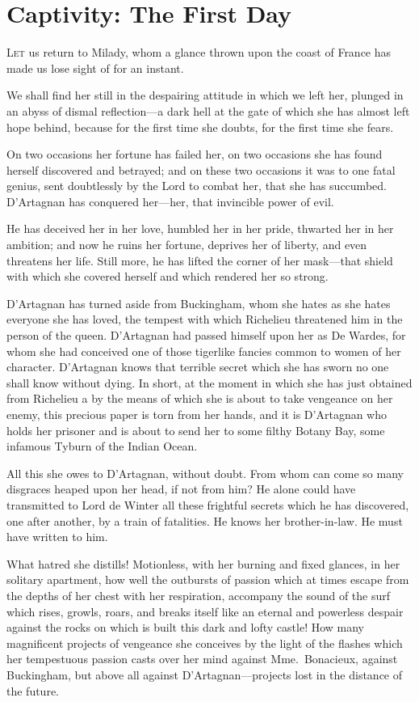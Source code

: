 
\chapter{Captivity: The First Day}

\lettrine{L}{et} us return to Milady, whom a glance thrown upon the coast of France has made us lose sight of for an instant. 

\zz
We shall find her still in the despairing attitude in which we left her, plunged in an abyss of dismal reflection—a dark hell at the gate of which she has almost left hope behind, because for the first time she doubts, for the first time she fears. 

On two occasions her fortune has failed her, on two occasions she has found herself discovered and betrayed; and on these two occasions it was to one fatal genius, sent doubtlessly by the Lord to combat her, that she has succumbed. D'Artagnan has conquered her—her, that invincible power of evil. 

He has deceived her in her love, humbled her in her pride, thwarted her in her ambition; and now he ruins her fortune, deprives her of liberty, and even threatens her life. Still more, he has lifted the corner of her mask—that shield with which she covered herself and which rendered her so strong. 

D'Artagnan has turned aside from Buckingham, whom she hates as she hates everyone she has loved, the tempest with which Richelieu threatened him in the person of the queen. D'Artagnan had passed himself upon her as De Wardes, for whom she had conceived one of those tigerlike fancies common to women of her character. D'Artagnan knows that terrible secret which she has sworn no one shall know without dying. In short, at the moment in which she has just obtained from Richelieu a  by the means of which she is about to take vengeance on her enemy, this precious paper is torn from her hands, and it is D'Artagnan who holds her prisoner and is about to send her to some filthy Botany Bay, some infamous Tyburn of the Indian Ocean. 

All this she owes to D'Artagnan, without doubt. From whom can come so many disgraces heaped upon her head, if not from him? He alone could have transmitted to Lord de Winter all these frightful secrets which he has discovered, one after another, by a train of fatalities. He knows her brother-in-law. He must have written to him. 

What hatred she distills! Motionless, with her burning and fixed glances, in her solitary apartment, how well the outbursts of passion which at times escape from the depths of her chest with her respiration, accompany the sound of the surf which rises, growls, roars, and breaks itself like an eternal and powerless despair against the rocks on which is built this dark and lofty castle! How many magnificent projects of vengeance she conceives by the light of the flashes which her tempestuous passion casts over her mind against Mme.~Bonacieux, against Buckingham, but above all against D'Artagnan—projects lost in the distance of the future. 

